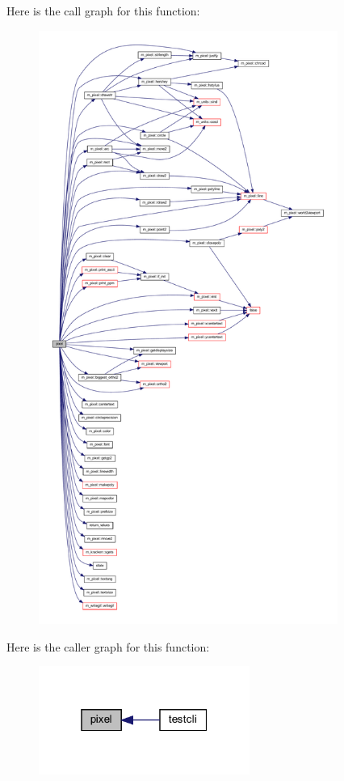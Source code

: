 Here is the call graph for this function\+:
\nopagebreak
\begin{figure}[H]
\begin{center}
\leavevmode
\includegraphics[height=550pt]{shell_8f90_a5c599e945a5e0c9c8954969ea48587cf_cgraph}
\end{center}
\end{figure}
Here is the caller graph for this function\+:
\nopagebreak
\begin{figure}[H]
\begin{center}
\leavevmode
\includegraphics[width=196pt]{shell_8f90_a5c599e945a5e0c9c8954969ea48587cf_icgraph}
\end{center}
\end{figure}
\mbox{\label{shell_8f90_a8e1579319e153f8b8d77b94fa94e9b37}} 
